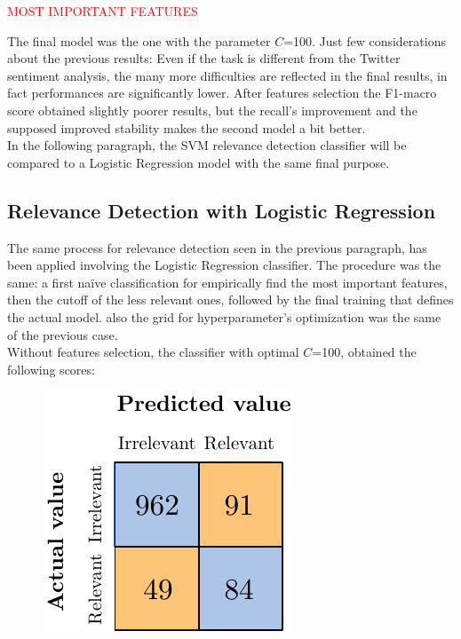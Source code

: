 \textcolor{red}{MOST IMPORTANT FEATURES}

The final model was the one with the parameter $C$=100. Just few considerations about the previous results: Even if the task is different from the Twitter sentiment analysis, the many more difficulties are reflected in the final results, in fact performances are significantly lower. After features selection the F1-macro score obtained slightly poorer results, but the recall's improvement and the supposed improved stability makes the second model a bit better.\\
In the following paragraph, the SVM relevance detection classifier will be compared to a Logistic Regression model with the same final purpose.


\subsection{Relevance Detection with Logistic Regression}

The same process for relevance detection seen in the previous paragraph, has been applied involving the Logistic Regression classifier. The procedure was the same: a first na{\"i}ve classification for empirically find the most important features, then the cutoff of the less relevant ones, followed by the final training that defines the actual model. also the grid for hyperparameter's optimization was the same of the previous case.\\
Without features selection, the classifier with optimal $C$=100, obtained the following scores:

\begin{figure}[H]
	\centering
	\includegraphics[scale=1]{figures/conf_matrices/ita_rel_logreg/ita_rel_logreg_bfs.pdf}
	\label{fig:ita_rel_logreg_bfs}
\end{figure}

